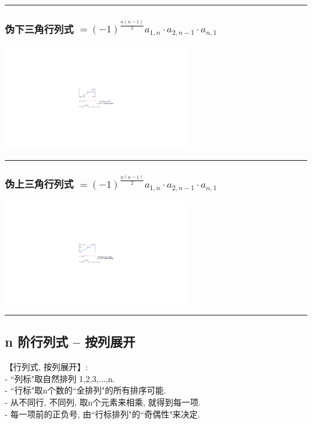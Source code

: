 \documentclass[UTF8]{ctexart}
\begin{document}
\hrule

\subsubsection{伪下三角行列式  $	=\left( -1 \right) ^{\frac{n\left( n-1 \right)}{2}}a_{1,n}\cdot a_{2,n-1}\cdot a_{n,1}	$}

\includegraphics[width=0.6\textwidth]{img/0004.pdf}\\



\hrule


\subsubsection{伪上三角行列式 $	=\left( -1 \right) ^{\frac{n\left( n-1 \right)}{2}}a_{1,n}\cdot a_{2,n-1}\cdot a_{n,1}	$}

\includegraphics[width=0.6\textwidth]{img/0005.pdf}\\



\hrule


	\subsection{n 阶行列式 -- 按列展开} 
	
	【行列式, 按列展开】:\\
	- ``列标"取自然排列 1,2,3,...,n.  \\
	- ``行标"取n个数的``全排列"的所有排序可能. \\
	- 从不同行, 不同列, 取n个元素来相乘, 就得到每一项. \\
	- 每一项前的正负号, 由``行标排列"的``奇偶性"来决定. \\
	
\end{document}

